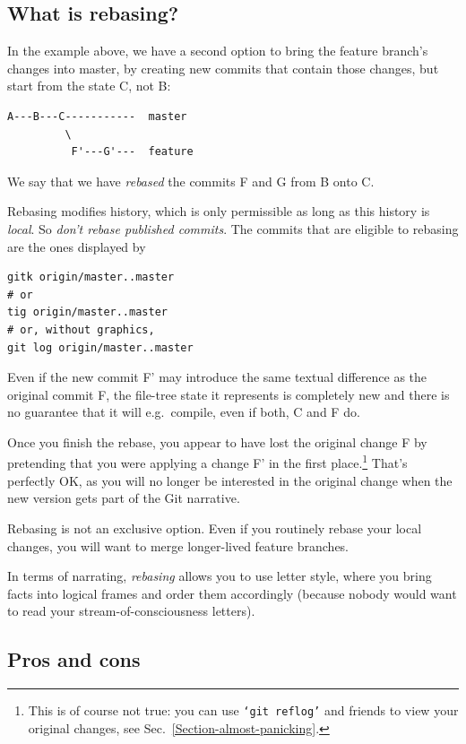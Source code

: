 \documentclass[12pt,pdftex]{article}
\begin{document}
\subsection{What is rebasing?}
\label{sec-4-2}
\label{Rebase}

In the example above, we have a second option to bring the feature
branch's changes into master, by creating new commits that contain
those changes, but start from the state C, not B:
\begin{verbatim}
A---B---C-----------  master
         \
          F'---G'---  feature
\end{verbatim}
We say that we have \emph{rebased} the commits F and G from B onto C.

Rebasing modifies history, which is only permissible as long as this
history is \emph{local}.
So \emph{don't rebase published commits}.
The commits that are eligible to rebasing are the ones displayed by
\lstset{frame=single,basicstyle=\ttfamily\footnotesize,language=sh,label= ,caption= ,captionpos=b,numbers=none}
\begin{lstlisting}
gitk origin/master..master
# or
tig origin/master..master
# or, without graphics,
git log origin/master..master
\end{lstlisting}

Even if the new commit F' may introduce the same textual
difference as the original commit F, the file-tree state it represents
is completely new and there is no guarantee that it will e.g.~compile,
even if both, C and F do.

Once you finish the rebase, you appear to have lost the original change
F by pretending that you were applying a change F' in the first
place.\footnote{This is of course not true: you can use \texttt{‘git reflog’} and friends
to view your original changes, see
Sec.~\ref{Section-almost-panicking}.}
That's perfectly OK, as you will no longer be interested in the
original change when the new version gets part of the Git narrative.


\bigskip

Rebasing is not an exclusive option.
Even if you routinely rebase your local changes, you will want to
merge longer-lived feature branches.

In terms of narrating, \emph{rebasing} allows you to use letter style, where
you bring facts into logical frames and order them accordingly (because
nobody would want to read your stream-of-consciousness letters).


\subsection{Pros and cons}
\label{sec-4-3}
\end{document}
